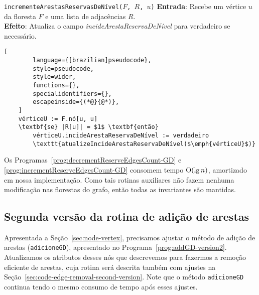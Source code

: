 \begin{programruledcaption}{\texttt{incrementeArestasReservasDeNível($F$, $R$, $u$)} \label{prog:incrementReserveEdgesCount-GD}}
    \noindent\textbf{Entrada}: Recebe um vértice $u$ da floresta $F$ e uma lista de adjacências $R$.\\
    \noindent\textbf{Efeito}: Atualiza o campo \textit{incideArestaReservaDeNível} para verdadeiro se necessário.
    \vspace{-0.5\baselineskip}
    \begin{lstlisting}[
        language={[brazilian]pseudocode},
        style=pseudocode,
        style=wider,
        functions={},
        specialidentifiers={},
        escapeinside={(*@}{@*)},
    ]
    vérticeU := F.nó[u, u]
    \textbf{se} |R[u]| = $1$ \textbf{então} 
        vérticeU.incideArestaReservaDeNível := verdadeiro
        \texttt{atualizeIncideArestaReservaDeNível($\emph{vérticeU}$)}
    \end{lstlisting}
    \vspace{-0.5\baselineskip}
\end{programruledcaption}


Os Programas~\ref{prog:decrementReserveEdgesCount-GD} e \ref{prog:incrementReserveEdgesCount-GD} consomem tempo $\mathrm{O}(\lg n)$, amortizado em nossa implementação. Como tais rotinas auxiliares não fazem nenhuma modificação nas florestas do grafo, então todas as invariantes são mantidas. 

\subsection{Segunda versão da rotina de adição de arestas}
\label{sec:code-edge-addition-second-version}

Apresentada a Seção~\ref{sec:node-vertex}, precisamos ajustar o método de adição de arestas (\texttt{adicioneGD}), apresentado no Programa~\ref{prog:addGD-version2}. Atualizamos os atributos desses nós que descrevemos para fazermos a remoção eficiente de arestas, cuja rotina será descrita também com ajustes na Seção~\ref{sec:code-edge-removal-second-version}. Note que o método \texttt{adicioneGD} continua tendo o mesmo consumo de tempo após esses ajustes. 

